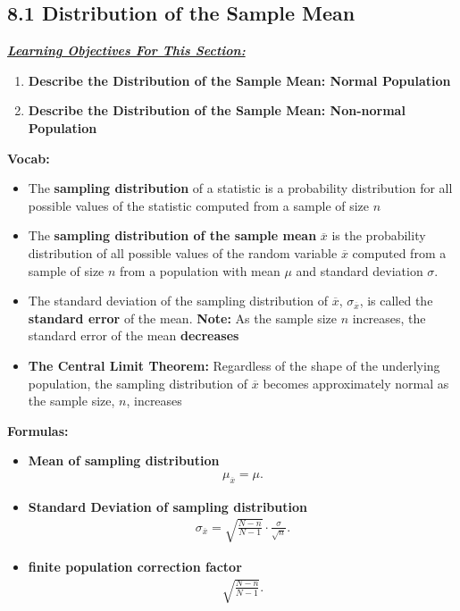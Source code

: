 \documentclass{report}
\begin{document}
    \subsection*{8.1 Distribution of the Sample Mean}
    \bigbreak \noindent 
    \textbf{\textit{\underline{Learning Objectives For This Section:}}}
    \begin{enumerate}
        \item \textbf{Describe the Distribution of the Sample Mean: Normal Population}
        \item \textbf{Describe the Distribution of the Sample Mean: Non-normal Population}
    \end{enumerate}
    \bigbreak \noindent 
    \textbf{Vocab:}
    \begin{itemize}
        \item The \textbf{sampling distribution} of a statistic is a probability distribution for all possible values of the statistic computed from a sample of size $n $
        \item The \textbf{sampling distribution of the sample mean} $\overline{x} $ is the probability distribution of all possible values of the random variable $\overline{x} $ computed from a sample of size $n$ from a population with mean $\mu $ and standard deviation $\sigma $.
        \item The standard deviation of the sampling distribution of $\overline{x} $, $\sigma_{\overline{x}} $, is called the \textbf{standard error} of the mean.
            \textbf{Note:} As the sample size $n $ increases, the standard error of the mean \textbf{decreases} 
        \item \textbf{The Central Limit Theorem:} Regardless of the shape of the underlying population, the sampling distribution of $\overline{x} $  becomes approximately normal as the sample size, $n $, increases
    \end{itemize}
    \bigbreak \noindent 
    \bigbreak \noindent 
    \textbf{Formulas:}
    \begin{itemize}
        \item \textbf{Mean of sampling distribution}
            \begin{align*}
                \mu_{\overline{x}} = \mu
            .\end{align*}
        \item \textbf{Standard Deviation of sampling distribution}
            \begin{align*}
                \sigma_{\overline{x}} = \sqrt{\frac{N-n}{N-1}} \cdot \frac{\sigma}{\sqrt{n}}
            .\end{align*}
        \item \textbf{finite population correction factor}
            \begin{align*}
                \sqrt{\frac{N-n}{N-1}}
            .\end{align*}
    \end{itemize}
\end{document}
